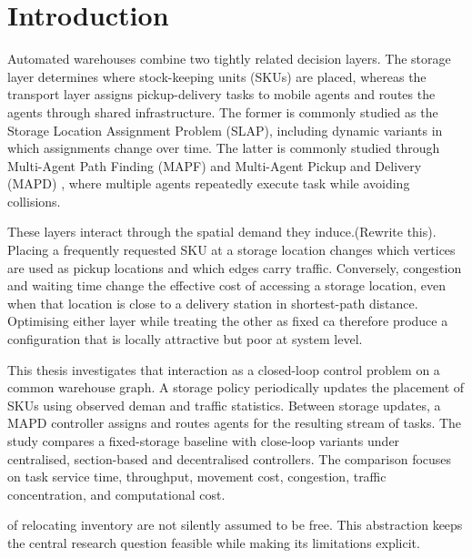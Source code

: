 \documentclass[../main.tex]{subfiles}
\begin{document}
\onecolumn


\section{Introduction}
\label{sec:introduction}
Automated warehouses combine two tightly related decision layers. The storage layer determines where stock-keeping units (SKUs) are placed, whereas the transport layer assigns pickup-delivery tasks to mobile agents and routes the agents through shared infrastructure. The former is commonly studied as the Storage Location Assignment Problem (SLAP), including dynamic variants in which assignments change over time. The latter is commonly studied through Multi-Agent Path Finding (MAPF) and Multi-Agent Pickup and Delivery (MAPD) \citep{ma2017lifelong}, where multiple agents repeatedly execute task while avoiding collisions.

These layers interact through the spatial demand they induce.(Rewrite this). Placing a frequently requested SKU at a storage location changes which vertices are used as pickup locations and which edges carry traffic. Conversely, congestion and waiting time change the effective cost of accessing a storage location, even when that location is close to a delivery station in shortest-path distance. Optimising either layer while treating the other as fixed ca therefore produce a configuration that is locally attractive but poor at system level.

This thesis investigates that interaction as a closed-loop control problem on a common warehouse graph. A storage policy periodically updates the placement of SKUs using observed deman and traffic statistics. Between storage updates, a MAPD controller assigns and routes agents for the resulting stream of tasks. The study compares a fixed-storage baseline with close-loop variants under centralised, section-based and decentralised controllers. The comparison focuses on task service time, throughput, movement cost, congestion, traffic concentration, and computational cost.

of relocating inventory are not silently assumed to be free. This abstraction keeps the central research question feasible while making its limitations explicit.
\end{document}
